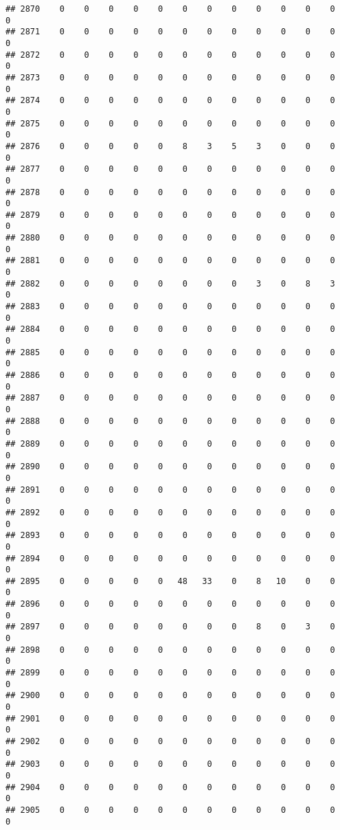 \documentclass[]{article}
\begin{document}
\begin{verbatim}
## 2870    0    0    0    0    0    0    0    0    0    0    0    0    0
## 2871    0    0    0    0    0    0    0    0    0    0    0    0    0
## 2872    0    0    0    0    0    0    0    0    0    0    0    0    0
## 2873    0    0    0    0    0    0    0    0    0    0    0    0    0
## 2874    0    0    0    0    0    0    0    0    0    0    0    0    0
## 2875    0    0    0    0    0    0    0    0    0    0    0    0    0
## 2876    0    0    0    0    0    8    3    5    3    0    0    0    0
## 2877    0    0    0    0    0    0    0    0    0    0    0    0    0
## 2878    0    0    0    0    0    0    0    0    0    0    0    0    0
## 2879    0    0    0    0    0    0    0    0    0    0    0    0    0
## 2880    0    0    0    0    0    0    0    0    0    0    0    0    0
## 2881    0    0    0    0    0    0    0    0    0    0    0    0    0
## 2882    0    0    0    0    0    0    0    0    3    0    8    3    0
## 2883    0    0    0    0    0    0    0    0    0    0    0    0    0
## 2884    0    0    0    0    0    0    0    0    0    0    0    0    0
## 2885    0    0    0    0    0    0    0    0    0    0    0    0    0
## 2886    0    0    0    0    0    0    0    0    0    0    0    0    0
## 2887    0    0    0    0    0    0    0    0    0    0    0    0    0
## 2888    0    0    0    0    0    0    0    0    0    0    0    0    0
## 2889    0    0    0    0    0    0    0    0    0    0    0    0    0
## 2890    0    0    0    0    0    0    0    0    0    0    0    0    0
## 2891    0    0    0    0    0    0    0    0    0    0    0    0    0
## 2892    0    0    0    0    0    0    0    0    0    0    0    0    0
## 2893    0    0    0    0    0    0    0    0    0    0    0    0    0
## 2894    0    0    0    0    0    0    0    0    0    0    0    0    0
## 2895    0    0    0    0    0   48   33    0    8   10    0    0    0
## 2896    0    0    0    0    0    0    0    0    0    0    0    0    0
## 2897    0    0    0    0    0    0    0    0    8    0    3    0    0
## 2898    0    0    0    0    0    0    0    0    0    0    0    0    0
## 2899    0    0    0    0    0    0    0    0    0    0    0    0    0
## 2900    0    0    0    0    0    0    0    0    0    0    0    0    0
## 2901    0    0    0    0    0    0    0    0    0    0    0    0    0
## 2902    0    0    0    0    0    0    0    0    0    0    0    0    0
## 2903    0    0    0    0    0    0    0    0    0    0    0    0    0
## 2904    0    0    0    0    0    0    0    0    0    0    0    0    0
## 2905    0    0    0    0    0    0    0    0    0    0    0    0    0

\end{verbatim}
\end{document}
